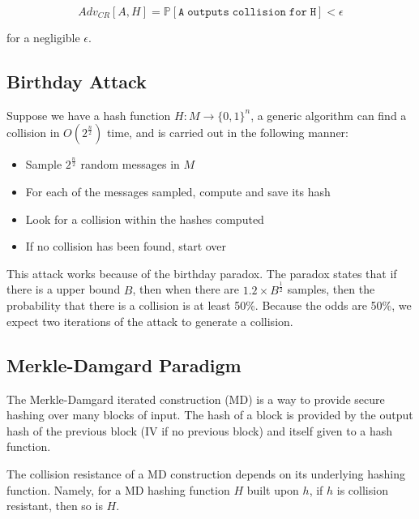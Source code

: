 \documentclass{article}
\begin{document}
\begin{multicols}{2}
$$
Adv_{CR}[A,H] = \mathbb{P}[\mathtt{A\;outputs\;collision\;for\;H}] < \epsilon
$$

for a negligible $\epsilon$.

\subsection{Birthday Attack}

Suppose we have a hash function $H: M \rightarrow \{0,1\}^n$, a generic algorithm can find a collision in $O(2^{\frac{n}{2}})$ time, and is carried out in the following manner:

\begin{itemize}
    \item Sample $2^{\frac{n}{2}}$ random messages in $M$
    \item For each of the messages sampled, compute and save its hash
    \item Look for a collision within the hashes computed
    \item If no collision has been found, start over
\end{itemize}

This attack works because of the birthday paradox. The paradox states that if there is a upper bound $B$, then when there are $1.2 \times B^{\frac{1}{2}}$ samples, then the probability that there is a collision is at least 50\%. Because the odds are 50\%, we expect two iterations of the attack to generate a collision.

\subsection{Merkle-Damgard Paradigm}

The Merkle-Damgard iterated construction (MD) is a way to provide secure hashing over many blocks of input. The hash of a block is provided by the output hash of the previous block (IV if no previous block) and itself given to a hash function.

The collision resistance of a MD construction depends on its underlying hashing function. Namely, for a MD hashing function $H$ built upon $h$, if $h$ is collision resistant, then so is $H$.

\end{multicols}
\end{document}
